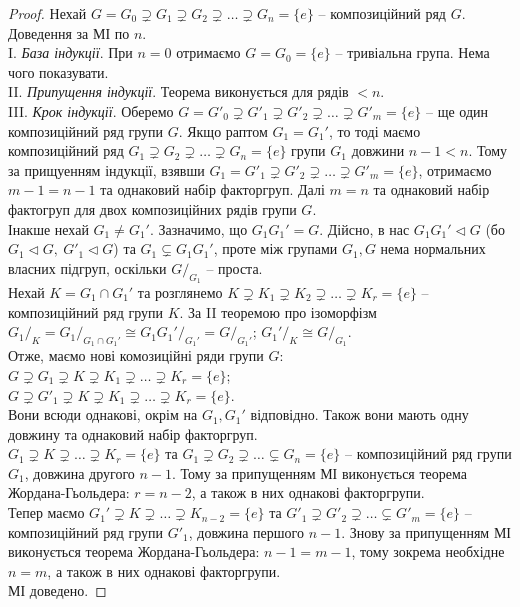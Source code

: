 \documentclass{math_library}
\begin{document}
\begin{proof}
Нехай $G = G_0 \supsetneq G_1 \supsetneq G_2 \supsetneq \dots \supsetneq G_n = \{e\}$ -- композиційний ряд $G$. Доведення за МІ по $n$.\\
I. \textit{База індукції}. При $n = 0$ отримаємо $G = G_0 = \{e\}$ -- тривіальна група. Нема чого показувати.\\
II. \textit{Припущення індукції}. Теорема виконується для рядів $<n$.\\
III. \textit{Крок індукції}. Оберемо $G = G'_0 \supsetneq G'_1 \supsetneq G'_2 \supsetneq \dots \supsetneq G'_m = \{e\}$ -- ще один композиційний ряд групи $G$. Якщо раптом $G_1 = G_1'$, то тоді маємо композиційний ряд $G_1 \supsetneq G_2 \supsetneq \dots \supsetneq G_n = \{e\}$ групи $G_1$ довжини $n-1 < n$. Тому за прищуенням індукції, взявши $G_1 = G'_1 \supsetneq G'_2 \supsetneq \dots \supsetneq G'_m = \{e\}$, отримаємо $m-1 = n-1$ та однаковий набір факторгруп. Далі $m = n$ та однаковий набір фактогруп для двох композиційних рядів групи $G$.\\
Інакше нехай $G_1 \neq G_1'$. Зазначимо, що $G_1  G_1' = G$. Дійсно, в нас $G_1 G_1' \triangleleft G$ (бо $G_1 \triangleleft G,\ G'_1 \triangleleft G$) та $G_1 \subsetneq G_1 G_1'$, проте між групами $G_1,G$ нема нормальних власних підгруп, оскільки $G/_{G_1}$ -- проста.\\
Нехай $K = G_1 \cap G_1'$ та розглянемо $K \supsetneq K_1 \supsetneq K_2 \supsetneq \dots \supsetneq K_r = \{e\}$ -- композиційний ряд групи $K$. За II теоремою про ізоморфізм\\
${G_1}/_K = {G_1}/_{G_1 \cap G_1'} \cong {G_1 G_1'}/_{G_1'} = G/_{G_1'}$; \qquad ${G_1'}/_K \cong G/_{G_1}$.\\
Отже, маємо нові комозиційні ряди групи $G$:\\
$G \supsetneq G_1 \supsetneq K \supsetneq K_1 \supsetneq \dots \supsetneq K_r = \{e\}$;\\
$G \supsetneq G'_1 \supsetneq K \supsetneq K_1 \supsetneq \dots \supsetneq K_r = \{e\}$.\\
Вони всюди однакові, окрім на $G_1,G_1'$ відповідно. Також вони мають одну довжину та однаковий набір факторгруп.\\
$G_1 \supsetneq K \supsetneq \dots \supsetneq K_r = \{e\}$ та $G_1 \supsetneq G_2 \supsetneq \dots \subsetneq G_n = \{e\}$ -- композиційний ряд групи $G_1$, довжина другого $n-1$. Тому за припущенням МІ виконується теорема Жордана-Гьольдера: $r = n-2$, а також в них однакові факторгрупи.\\
Тепер маємо $G_1' \supsetneq K \supsetneq \dots \supsetneq K_{n-2} = \{e\}$ та $G'_1 \supsetneq G'_2 \supsetneq \dots \subsetneq G'_m = \{e\}$ -- композиційний ряд групи $G'_1$, довжина першого $n-1$. Знову за припущенням МІ виконується теорема Жордана-Гьольдера: $n-1 = m-1$, тому зокрема необхідне $n = m$, а також в них однакові факторгрупи.\\
МІ доведено.
\end{proof}
\end{document}

